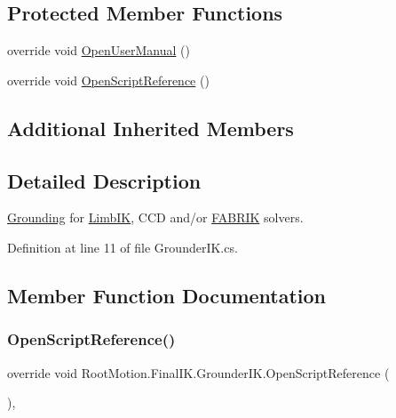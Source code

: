 \subsection*{Protected Member Functions}
\begin{DoxyCompactItemize}
\item 
override void \mbox{\hyperlink{class_root_motion_1_1_final_i_k_1_1_grounder_i_k_ae94b6c991b39a6fef2931378121969e7}{Open\+User\+Manual}} ()
\item 
override void \mbox{\hyperlink{class_root_motion_1_1_final_i_k_1_1_grounder_i_k_ac89b8c0bc37e1832f962682d9655721c}{Open\+Script\+Reference}} ()
\end{DoxyCompactItemize}
\subsection*{Additional Inherited Members}


\subsection{Detailed Description}
\mbox{\hyperlink{class_root_motion_1_1_final_i_k_1_1_grounding}{Grounding}} for \mbox{\hyperlink{class_root_motion_1_1_final_i_k_1_1_limb_i_k}{Limb\+IK}}, C\+CD and/or \mbox{\hyperlink{class_root_motion_1_1_final_i_k_1_1_f_a_b_r_i_k}{F\+A\+B\+R\+IK}} solvers. 



Definition at line 11 of file Grounder\+I\+K.\+cs.



\subsection{Member Function Documentation}
\mbox{\label{class_root_motion_1_1_final_i_k_1_1_grounder_i_k_ac89b8c0bc37e1832f962682d9655721c}} 
\subsubsection{\texorpdfstring{Open\+Script\+Reference()}{OpenScriptReference()}}
{\footnotesize\ttfamily override void Root\+Motion.\+Final\+I\+K.\+Grounder\+I\+K.\+Open\+Script\+Reference (\begin{DoxyParamCaption}{ }\end{DoxyParamCaption})\hspace{0.3cm}{\ttfamily [protected]}, {\ttfamily [virtual]}}



